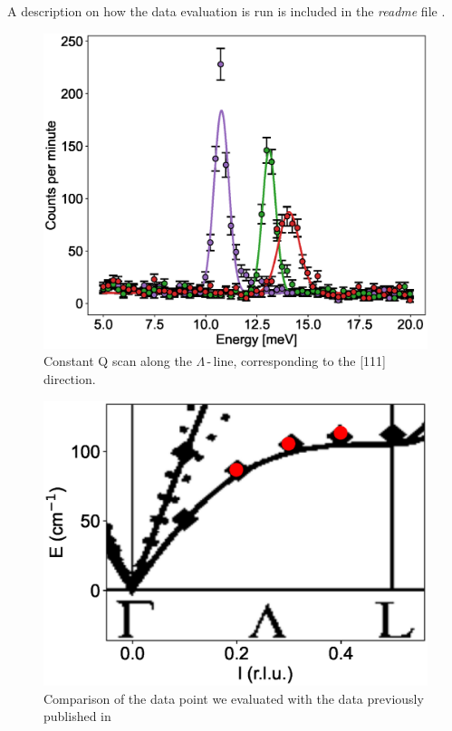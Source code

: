 \documentclass[aps,pra,reprint,amsmath,amssymb,superscriptaddress,showkeys]{revtex4-1}
\begin{document}
A description on how the data evaluation is run is included in the \emph{readme} file \cite{data-evaluation}.


\begin{figure}
    \includegraphics[width=1.0\linewidth]{energy-scan.eps}
    \caption{\label{fig1} Constant Q scan along the $\Lambda$\,-\,line, corresponding to the [111] direction.}
\end{figure}

\begin{figure}
    \includegraphics[width=1.0\linewidth]{dispersion.eps}
    \caption{Comparison of the data point we evaluated with the data previously published in \cite{Aouissi} }
    \label{fig2}
\end{figure}
\end{document}
